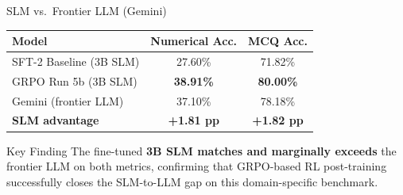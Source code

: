 \documentclass[10pt]{beamer}
\begin{document}
\begin{frame}{SLM vs.\ Frontier LLM (Gemini)}
\begin{center}
\large
\begin{tabular}{lcc}
    \toprule
    \textbf{Model} & \textbf{Numerical Acc.} & \textbf{MCQ Acc.} \\
    \midrule
    SFT-2 Baseline (3B SLM) & 27.60\% & 71.82\% \\
    GRPO Run 5b (3B SLM) & \textbf{38.91\%} & \textbf{80.00\%} \\
    Gemini (frontier LLM) & 37.10\% & 78.18\% \\
    \midrule
    \textbf{SLM advantage} & \textbf{+1.81 pp} & \textbf{+1.82 pp} \\
    \bottomrule
\end{tabular}
\end{center}

\vspace{0.4cm}

\begin{block}{Key Finding}
The fine-tuned \textbf{3B SLM matches and marginally exceeds} the frontier LLM on both metrics, confirming that GRPO-based RL post-training successfully closes the SLM-to-LLM gap on this domain-specific benchmark.
\end{block}
\end{frame}
\end{document}
